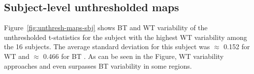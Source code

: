 \documentclass[conference]{IEEEtran}
\begin{document}
  \subsection{Subject-level unthresholded maps}


  Figure~\ref{fig:unthresh-maps-sbj} shows BT and WT variability of the
  unthresholded t-statistics for the subject with the highest WT
  variability among the 16 subjects. The average standard deviation for
  this subject was $\approx$ 0.152 for WT and $\approx$ 0.466 for BT
  .
  As can be seen in the Figure, WT variability approaches and even surpasses BT variability in some regions.
  

\begin{figure}[ht]
\end{figure}
\end{document}
